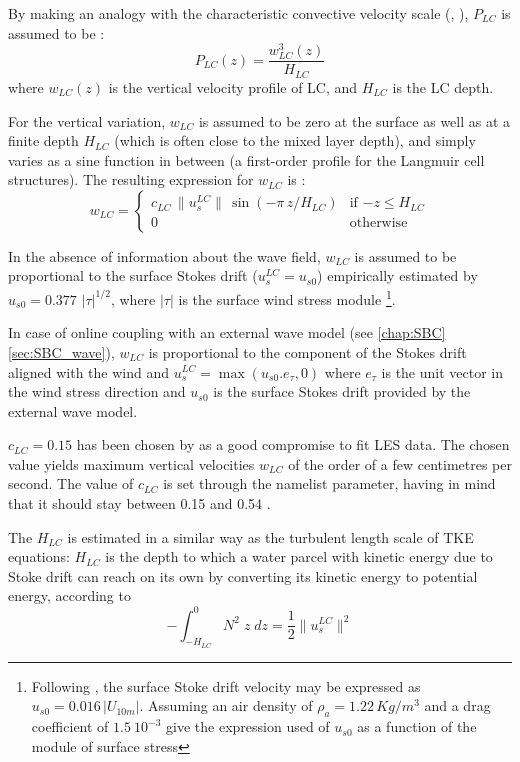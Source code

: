 \documentclass[../main/NEMO_manual]{subfiles}
\begin{document}
By making an analogy with the characteristic convective velocity scale (\eg, \citet{dalessio.abdella.ea_JPO98}),
$P_{LC}$ is assumed to be :
\[
P_{LC}(z) = \frac{w_{LC}^3(z)}{H_{LC}}
\]
where $w_{LC}(z)$ is the vertical velocity profile of LC, and $H_{LC}$ is the LC depth.

For the vertical variation, $w_{LC}$ is assumed to be zero at the surface as well as at
a finite depth $H_{LC}$ (which is often close to the mixed layer depth),
and simply varies as a sine function in between (a first-order profile for the Langmuir cell structures).
The resulting expression for $w_{LC}$ is :
\[
  w_{LC}  =
  \begin{cases}
    c_{LC} \,\|u_s^{LC}\| \,\sin(- \pi\,z / H_{LC} )    &      \text{if $-z \leq H_{LC}$} 	\\
    0                 				 &      \text{otherwise}
  \end{cases}
\]


In the absence of information about the wave field, $w_{LC}$ is assumed to be proportional to
the surface Stokes drift ($u_s^{LC}=u_{s0} $) empirically estimated by $ u_{s0} = 0.377\,\,|\tau|^{1/2}$, where $|\tau|$ is the surface wind stress module
\footnote{Following \citet{li.garrett_JMR93}, the surface Stoke drift velocity may be expressed as
  $u_{s0} =  0.016 \,|U_{10m}|$.
  Assuming an air density of $\rho_a=1.22 \,Kg/m^3$ and a drag coefficient of
  $1.5~10^{-3}$ give the expression used of $u_{s0}$ as a function of the module of surface stress
}.

In case of online coupling with an external wave model (see \autoref{chap:SBC} \autoref{sec:SBC_wave}), $w_{LC}$ is proportional to the component of the Stokes drift aligned with the wind \citep{couvelard_2020} and $ u_s^{LC}  = \max(u_{s0}.e_\tau,0)$ where $e_\tau$ is the unit vector in the wind stress direction and $u_{s0}$ is the surface Stokes drift provided by the external wave model.


$c_{LC} = 0.15$ has been chosen by \citep{axell_JGR02} as a good compromise to fit LES data.
The chosen value yields maximum vertical velocities $w_{LC}$ of the order of a few centimetres per second.
The value of $c_{LC}$ is set through the  namelist parameter,
having in mind that it should stay between 0.15 and 0.54 \citep{axell_JGR02}.

The $H_{LC}$ is estimated in a similar way as the turbulent length scale of TKE equations:
$H_{LC}$ is the depth to which a water parcel with kinetic energy due to Stoke drift can reach on its own by
converting its kinetic energy to potential energy, according to
\[
- \int_{-H_{LC}}^0 { N^2\;z  \;dz} = \frac{1}{2} \|u_s^{LC}\|^2
\]
\end{document}
